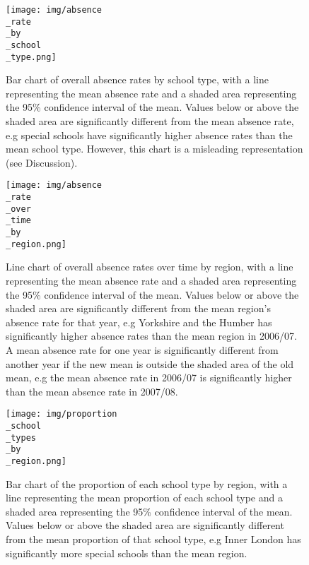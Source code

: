 \documentclass{article}
\begin{document}
\begin{figure}[htbp]
    \centering
    \texttt{[image: img/absence\\\_rate\\\_by\\\_school\\\_type.png]}
    \caption{Bar chart of overall absence rates by school type, with a line representing the mean absence rate and a shaded area representing the 95\% confidence interval of the mean. Values below or above the shaded area are significantly different from the mean absence rate, e.g special schools have significantly higher absence rates than the mean school type. However, this chart is a misleading representation (see Discussion).}
    \label{fig:absence_rate_by_school_type}
\end{figure}

\begin{figure}[htbp]
    \centering
    \texttt{[image: img/absence\\\_rate\\\_over\\\_time\\\_by\\\_region.png]}
    \caption{Line chart of overall absence rates over time by region, with a line representing the mean absence rate and a shaded area representing the 95\% confidence interval of the mean. Values below or above the shaded area are significantly different from the mean region's absence rate for that year, e.g Yorkshire and the Humber has significantly higher absence rates than the mean region in 2006/07. A mean absence rate for one year is significantly different from another year if the new mean is outside the shaded area of the old mean, e.g the mean absence rate in 2006/07 is significantly higher than the mean absence rate in 2007/08.}
    \label{fig:absence_rate_over_time_by_region}
\end{figure}

\begin{figure}[htbp]
    \centering
    \texttt{[image: img/proportion\\\_school\\\_types\\\_by\\\_region.png]}
    \caption{Bar chart of the proportion of each school type by region, with a line representing the mean proportion of each school type and a shaded area representing the 95\% confidence interval of the mean. Values below or above the shaded area are significantly different from the mean proportion of that school type, e.g Inner London has significantly more special schools than the mean region.}
    \label{fig:proportion_school_types_by_region}
\end{figure}
\end{document}
